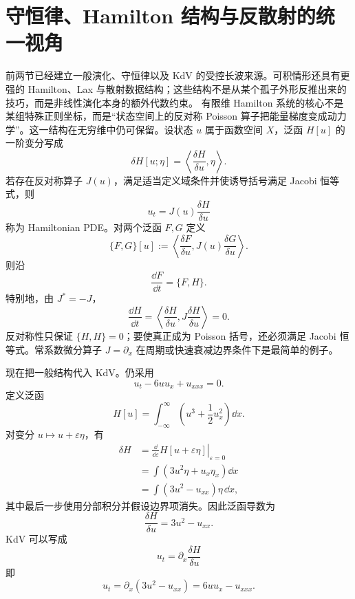 \section{守恒律、Hamilton 结构与反散射的统一视角}

前两节已经建立一般演化、守恒律以及 KdV 的受控长波来源。可积情形还具有更强的 Hamilton、Lax 与散射数据结构；这些结构不是从某个孤子外形反推出来的技巧，而是非线性演化本身的额外代数约束。
有限维 Hamilton 系统的核心不是某组特殊正则坐标，而是“状态空间上的反对称 Poisson 算子把能量梯度变成动力学”。这一结构在无穷维中仍可保留。设状态 $u$ 属于函数空间 $X$，泛函 $H[u]$ 的一阶变分写成
\[
\delta H[u;\eta]
=\left\langle \frac{\delta H}{\delta u},\eta\right\rangle.
\]
若存在反对称算子 $J(u)$，满足适当定义域条件并使诱导括号满足 Jacobi 恒等式，则
\begin{equation}
 u_t=J(u)\frac{\delta H}{\delta u}
\label{eq:general-hamiltonian-pde}
\end{equation}
称为 Hamiltonian PDE。对两个泛函 $F,G$ 定义
\begin{equation}
\{F,G\}[u]
:=\left\langle
\frac{\delta F}{\delta u},
J(u)\frac{\delta G}{\delta u}
\right\rangle.
\label{eq:functional-poisson-bracket}
\end{equation}
则沿
\[
\frac{\dd F}{\dd t}=\{F,H\}.
\]
特别地，由 $J^*=-J$，
\[
\frac{\dd H}{\dd t}
=\left\langle \frac{\delta H}{\delta u},
J\frac{\delta H}{\delta u}\right\rangle=0.
\]
反对称性只保证 $\{H,H\}=0$；要使真正成为 Poisson 括号，还必须满足 Jacobi 恒等式。常系数微分算子 $J=\partial_x$ 在周期或快速衰减边界条件下是最简单的例子。

现在把一般结构代入 KdV。仍采用
\[
u_t-6u u_x+u_{xxx}=0.
\]
定义泛函
\[
H[u]=\int_{-\infty}^{\infty}
\left(u^3+\frac12u_x^2\right)\dd x.
\]
对变分 $u\mapsto u+\varepsilon\eta$，有
\[
\begin{aligned}
\delta H
&=\left.\frac{\dd}{\dd\varepsilon}
H[u+\varepsilon\eta]\right|_{\varepsilon=0}\\
&=\int\left(3u^2\eta+u_x\eta_x\right)\dd x\\
&=\int\left(3u^2-u_{xx}\right)\eta\,\dd x,
\end{aligned}
\]
其中最后一步使用分部积分并假设边界项消失。因此泛函导数为
\[
\frac{\delta H}{\delta u}=3u^2-u_{xx}.
\]
KdV 可以写成
\begin{equation*}\boxed{
u_t=\partial_x\frac{\delta H}{\delta u}}\end{equation*}
即
\[
u_t=\partial_x(3u^2-u_{xx})=6u u_x-u_{xxx}.
\]

